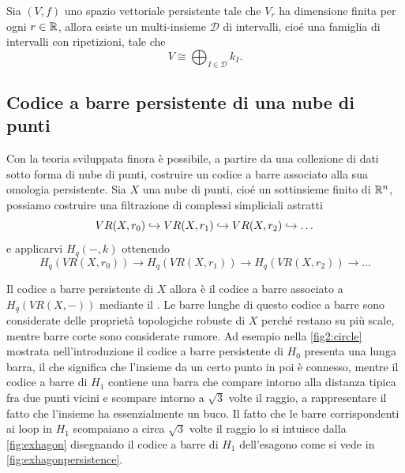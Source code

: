 \begin{theorem}\label{thm:persistentdecomposition}
  Sia $(V,f)$ uno spazio vettoriale persistente tale che $V_r$ ha dimensione finita per ogni $r\in\mathbb{R}$, allora esiste un
  multi-insieme $\mathcal{D}$ di intervalli, cioé una famiglia di intervalli con ripetizioni, tale che
  \begin{equation*}
    V\cong \bigoplus_{I\in\mathcal{D}} k_I.
  \end{equation*}
\end{theorem}

\subsection{Codice a barre persistente di una nube di punti}

Con la teoria sviluppata finora è possibile, a partire da una collezione di dati sotto forma di nube di punti, costruire un codice a barre associato alla sua omologia persistente. Sia $X$ una nube di punti, cioé un sottinsieme finito di $\mathbb{R}^n$, possiamo costruire una filtrazione di complessi simpliciali astratti
\begin{equation*}
  VR(X,r_0)\hookrightarrow VR(X,r_1)\hookrightarrow VR(X,r_2)\hookrightarrow \dots
\end{equation*}
e applicarvi $H_q(-,k)$ ottenendo
\begin{equation*}
  H_q(VR(X,r_0))\to H_q(VR(X,r_1))\to H_q(VR(X,r_2))\to \dots
\end{equation*}

Il codice a barre persistente di $X$ allora è il codice a barre associato a $H_q(VR(X,-))$ mediante il . Le barre lunghe di questo codice a barre sono considerate delle proprietà topologiche robuste di $X$ perché restano su più scale, mentre barre corte sono considerate rumore. Ad esempio nella \cref{fig2:circle} mostrata nell'introduzione il codice a barre persistente di $H_0$ presenta una lunga barra, il che significa che l'insieme da un certo punto in poi è connesso, mentre il codice a barre di $H_1$ contiene una barra che compare intorno alla distanza tipica fra due punti vicini e scompare intorno a $\sqrt{3}$ volte il raggio, a rappresentare il fatto che l'insieme ha essenzialmente un buco. Il fatto che le barre corrispondenti ai loop in $H_1$ scompaiano a circa $\sqrt{3}$ volte il raggio lo si intuisce dalla \cref{fig:exhagon} disegnando il codice a barre di $H_1$ dell'esagono come si vede in \cref{fig:exhagonpersistence}.

